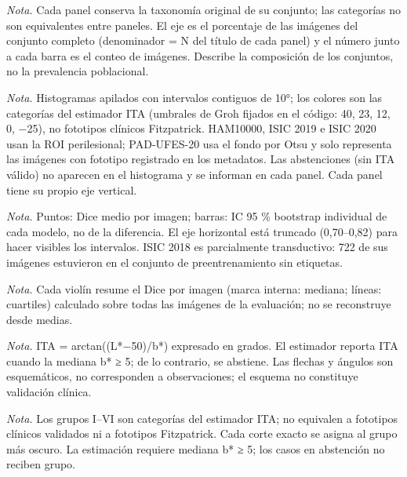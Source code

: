 
\caption{Distribución diagnóstica de HAM10000, ISIC 2019, ISIC 2020 y PAD-UFES-20.}
\textit{Nota.} Cada panel conserva la taxonomía original de su conjunto; las categorías no son equivalentes entre paneles. El eje es el porcentaje de las imágenes del conjunto completo (denominador = N del título de cada panel) y el número junto a cada barra es el conteo de imágenes. Describe la composición de los conjuntos, no la prevalencia poblacional.

\caption{Distribución del ITA estimado en HAM10000, ISIC 2019, ISIC 2020 y PAD-UFES-20.}
\textit{Nota.} Histogramas apilados con intervalos contiguos de 10°; los colores son las categorías del estimador ITA (umbrales de Groh fijados en el código: 40, 23, 12, 0, −25), no fototipos clínicos Fitzpatrick. HAM10000, ISIC 2019 e ISIC 2020 usan la ROI perilesional; PAD-UFES-20 usa el fondo por Otsu y solo representa las imágenes con fototipo registrado en los metadatos. Las abstenciones (sin ITA válido) no aparecen en el histograma y se informan en cada panel. Cada panel tiene su propio eje vertical.

\caption{Dice medio con IC 95 \% de student\_r3 y S4-A2 en ISIC 2018 y HAM10000.}
\textit{Nota.} Puntos: Dice medio por imagen; barras: IC 95 \% bootstrap individual de cada modelo, no de la diferencia. El eje horizontal está truncado (0,70–0,82) para hacer visibles los intervalos. ISIC 2018 es parcialmente transductivo: 722 de sus imágenes estuvieron en el conjunto de preentrenamiento sin etiquetas.

\caption{Distribución del Dice por imagen de student\_r3 y S4-A2 en ISIC 2018 y HAM10000.}
\textit{Nota.} Cada violín resume el Dice por imagen (marca interna: mediana; líneas: cuartiles) calculado sobre todas las imágenes de la evaluación; no se reconstruye desde medias.

\caption{Esquema conceptual del ángulo ITA a partir de las coordenadas CIELAB L* y b*.}
\textit{Nota.} ITA = arctan((L*−50)/b*) expresado en grados. El estimador reporta ITA cuando la mediana b* ≥ 5; de lo contrario, se abstiene. Las flechas y ángulos son esquemáticos, no corresponden a observaciones; el esquema no constituye validación clínica.

\caption{Reglas de pertenencia para grupos del estimador ITA, según los cortes de Groh.}
\textit{Nota.} Los grupos I–VI son categorías del estimador ITA; no equivalen a fototipos clínicos validados ni a fototipos Fitzpatrick. Cada corte exacto se asigna al grupo más oscuro. La estimación requiere mediana b* ≥ 5; los casos en abstención no reciben grupo.


